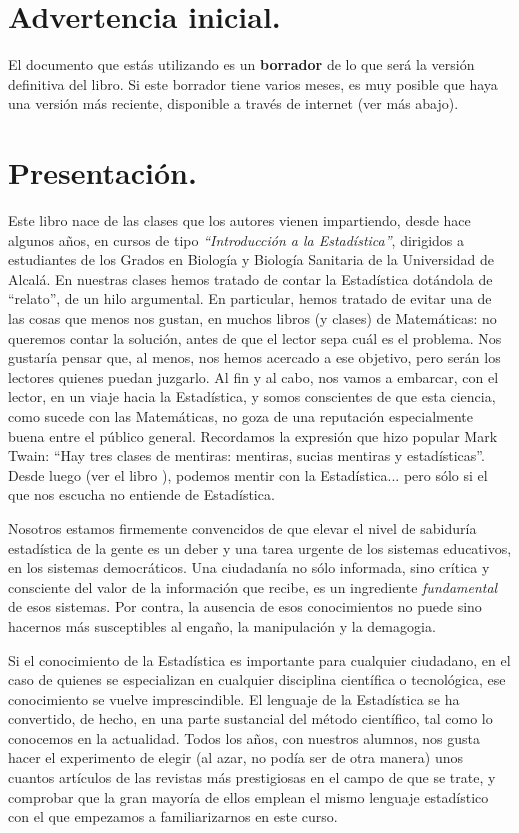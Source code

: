 
\section*{Advertencia inicial.}  El documento que estás utilizando es un {\bf borrador} de lo que será la versión definitiva del libro. Si este borrador tiene varios meses, es muy posible que haya una versión más reciente, disponible a través de internet (ver más abajo).

\section*{Presentación.}

Este libro nace de las clases que los autores vienen impartiendo, desde hace algunos años, en cursos de tipo {\em ``Introducción a la Estadística''}, dirigidos a estudiantes de los Grados en Biología y Biología Sanitaria de la Universidad de Alcalá. En nuestras clases hemos tratado de contar la Estadística dotándola de ``relato'', de un hilo argumental. En particular, hemos tratado de evitar una de las cosas que menos nos gustan, en muchos libros (y clases) de Matemáticas: no queremos contar la solución, antes de que el lector sepa cuál es el problema. Nos gustaría pensar que, al menos, nos hemos acercado a ese objetivo, pero serán los lectores quienes puedan juzgarlo. Al fin y al cabo, nos vamos a embarcar, con el lector, en un viaje hacia la Estadística, y somos conscientes de que esta ciencia, como sucede con las Matemáticas, no goza de una reputación especialmente buena entre el público general. Recordamos la expresión que hizo popular Mark Twain: ``Hay tres clases de mentiras: mentiras, sucias mentiras y estadísticas''. Desde luego (ver el libro \cite{huff2010lie}), podemos mentir con la Estadística... pero sólo si el que nos escucha no entiende de Estadística.

Nosotros estamos firmemente convencidos de que elevar el nivel de sabiduría estadística de la gente es un deber y una tarea urgente de los sistemas educativos, en los sistemas democráticos.  Una ciudadanía no sólo informada, sino crítica y consciente del valor de la información que recibe, es un ingrediente {\em fundamental} de esos sistemas. Por contra, la ausencia de esos conocimientos no puede sino hacernos más susceptibles al engaño, la manipulación y la demagogia.

Si el conocimiento de la Estadística es importante para cualquier ciudadano, en el caso de quienes se especializan en cualquier disciplina científica o tecnológica, ese conocimiento se vuelve imprescindible. El lenguaje de la Estadística se ha convertido, de hecho, en una parte sustancial del método científico, tal como lo conocemos en la actualidad. Todos los años, con nuestros alumnos, nos gusta hacer el experimento de elegir (al azar, no podía ser de otra manera) unos cuantos artículos de las revistas más prestigiosas en el campo de que se trate, y comprobar que la gran mayoría de ellos emplean el mismo lenguaje estadístico con el que empezamos a familiarizarnos en este curso.

